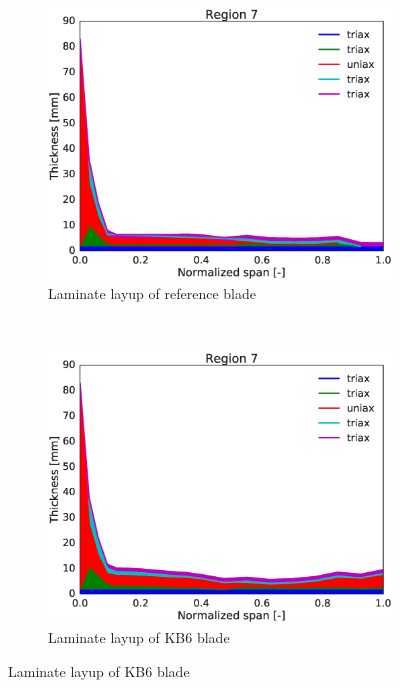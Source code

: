 \begin{figure}[tph]
\begin{subfigure}{0.50\textwidth}
\includegraphics[width=\linewidth]{figures/KB6_final/baseline_laminate_layers_r07.eps}
\caption{Laminate layup of reference blade}
\label{subfig:baseline_layers_r07}
\end{subfigure}
 ~
\begin{subfigure}{0.50\textwidth}
\includegraphics[width=\linewidth]{figures/KB6_final/KB6_laminate_layers_r07.eps}
\caption{Laminate layup of KB6 blade}
\label{subfig:KB6_layers_r07}
\end{subfigure}


\end{figure}

